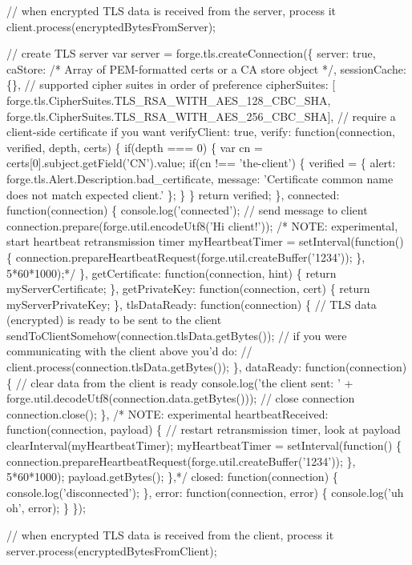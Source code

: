 \begin{DoxyCode}
// when encrypted TLS data is received from the server, process it
client.process(encryptedBytesFromServer);

// create TLS server
var server = forge.tls.createConnection(\{
  server: true,
  caStore: /* Array of PEM-formatted certs or a CA store object */,
  sessionCache: \{\},
  // supported cipher suites in order of preference
  cipherSuites: [
    forge.tls.CipherSuites.TLS\_RSA\_WITH\_AES\_128\_CBC\_SHA,
    forge.tls.CipherSuites.TLS\_RSA\_WITH\_AES\_256\_CBC\_SHA],
  // require a client-side certificate if you want
  verifyClient: true,
  verify: function(connection, verified, depth, certs) \{
    if(depth === 0) \{
      var cn = certs[0].subject.getField('CN').value;
      if(cn !== 'the-client') \{
        verified = \{
          alert: forge.tls.Alert.Description.bad\_certificate,
          message: 'Certificate common name does not match expected client.'
        \};
      \}
    \}
    return verified;
  \},
  connected: function(connection) \{
    console.log('connected');
    // send message to client
    connection.prepare(forge.util.encodeUtf8('Hi client!'));
    /* NOTE: experimental, start heartbeat retransmission timer
    myHeartbeatTimer = setInterval(function() \{
      connection.prepareHeartbeatRequest(forge.util.createBuffer('1234'));
    \}, 5*60*1000);*/
  \},
  getCertificate: function(connection, hint) \{
    return myServerCertificate;
  \},
  getPrivateKey: function(connection, cert) \{
    return myServerPrivateKey;
  \},
  tlsDataReady: function(connection) \{
    // TLS data (encrypted) is ready to be sent to the client
    sendToClientSomehow(connection.tlsData.getBytes());
    // if you were communicating with the client above you'd do:
    // client.process(connection.tlsData.getBytes());
  \},
  dataReady: function(connection) \{
    // clear data from the client is ready
    console.log('the client sent: ' +
      forge.util.decodeUtf8(connection.data.getBytes()));
    // close connection
    connection.close();
  \},
  /* NOTE: experimental
  heartbeatReceived: function(connection, payload) \{
    // restart retransmission timer, look at payload
    clearInterval(myHeartbeatTimer);
    myHeartbeatTimer = setInterval(function() \{
      connection.prepareHeartbeatRequest(forge.util.createBuffer('1234'));
    \}, 5*60*1000);
    payload.getBytes();
  \},*/
  closed: function(connection) \{
    console.log('disconnected');
  \},
  error: function(connection, error) \{
    console.log('uh oh', error);
  \}
\});

// when encrypted TLS data is received from the client, process it
server.process(encryptedBytesFromClient);
\end{DoxyCode}


